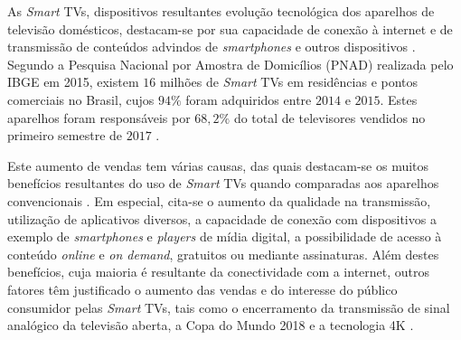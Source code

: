 
As \emph{Smart} TVs, dispositivos resultantes evolução tecnológica dos aparelhos de televisão domésticos, destacam-se por sua capacidade de conexão à internet e de transmissão de conteúdos advindos de \emph{smartphones} e outros dispositivos \cite{samsung:smarttv,perakakis2015proposed}.
Segundo a Pesquisa Nacional por Amostra de Domicílios (PNAD) realizada pelo IBGE em 2015, existem $16$ milhões de \emph{Smart} TVs em residências e pontos comerciais no Brasil, cujos $94\%$ foram adquiridos entre $2014$ e $2015$. Estes aparelhos foram responsáveis por $68,2\%$ do total de televisores vendidos no primeiro semestre de $2017$ \cite{pnad2015}.



Este aumento de vendas tem várias causas, das quais destacam-se os muitos benefícios resultantes do uso de \emph{Smart} TVs quando comparadas aos aparelhos convencionais \cite{shin2013smart,differencebetween}. Em especial, cita-se o aumento da qualidade na transmissão, utilização de aplicativos diversos, a capacidade de conexão com dispositivos a exemplo de \emph{smartphones} e \emph{players} de mídia digital, a possibilidade de acesso à conteúdo \emph{online} e \emph{on demand}, gratuitos ou mediante assinaturas. Além destes benefícios, cuja maioria é resultante da conectividade com a internet, outros fatores têm justificado o aumento das vendas e do interesse do público consumidor pelas \emph{Smart} TVs, tais como o encerramento da transmissão de sinal analógico da televisão aberta, a Copa do Mundo 2018 e a tecnologia 4K \cite{leiajabuscasmart,correiopnad,estadao:explosaovideosonline}.

